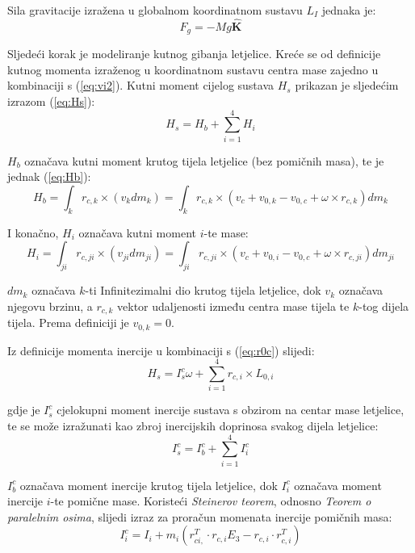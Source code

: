 \documentclass[11pt,a4paper]{article}
\begin{document}
Sila gravitacije izražena u globalnom koordinatnom sustavu $L_{I}$ jednaka je:
\begin{equation}
F_{g} = -Mg \bm{\hat{K}}
\label{eq:Fg}
\end{equation}


Sljedeći korak je modeliranje kutnog gibanja letjelice. Kreće se od definicije kutnog momenta izraženog u koordinatnom sustavu centra mase zajedno u kombinaciji s (\ref{eq:vi2}). Kutni moment cijelog sustava $H_{s}$ prikazan je sljedećim izrazom (\ref{eq:Hs}):
\begin{equation}
H_{s} = H_{b} + \sum_{i=1}^{4}H_{i}
\label{eq:Hs}
\end{equation}

$H_{b}$ označava kutni moment krutog tijela letjelice (bez pomičnih masa), te je jednak (\ref{eq:Hb}):
\begin{equation}
H_{b} = \int_{k} r_{c,k} \times (v_{k}dm_{k}) = \int_{k} r_{c,k} \times (v_{c} + v_{0,k} - v_{0,c} + \omega \times r_{c,k})dm_{k}
\label{eq:Hb}
\end{equation}

I konačno, $H_{i}$ označava kutni moment $i$-te mase:
\begin{equation}
H_{i} = \int_{ji} r_{c,ji} \times (v_{ji}dm_{ji}) = \int_{ji} r_{c,ji} \times (v_{c} + v_{0,i} - v_{0,c} + \omega \times r_{c,ji})dm_{ji}
\label{eq:Hi}
\end{equation}

$dm_{k}$ označava $k$-ti Infinitezimalni dio krutog tijela letjelice, dok $v_{k}$ označava njegovu brzinu, a $r_{c,k}$ vektor udaljenosti između centra mase tijela te $k$-tog dijela tijela. Prema definiciji je $v_{0,k} = 0$. 

Iz definicije momenta inercije u kombinaciji s (\ref{eq:r0c}) slijedi:
\begin{equation}
H_{s} = I_{s}^{c}\omega + \sum_{i=1}^{4}r_{c,i} \times L_{0,i}
\label{eq:Hs2}
\end{equation}

gdje je $I_{s}^{c}$ cjelokupni moment inercije sustava s obzirom na centar mase letjelice, te se može izražunati kao zbroj inercijskih doprinosa svakog dijela letjelice:
\begin{equation}
I_{s}^{c} = I_{b}^{c} + \sum_{i=1}^{4}I_{i}^{c}
\label{eq:Ics}
\end{equation}

$I_{b}^{c}$ označava moment inercije krutog tijela letjelice, dok $I_{i}^{c}$ označava moment inercije $i$-te pomične mase. Koristeći \textit{Steinerov teorem}, odnosno \textit{Teorem o paralelnim osima}, slijedi izraz za proračun momenata inercije pomičnih masa:
\begin{equation}
I_{i}^{c} = I_{i} + m_{i} \left(  r_{ci,}^{T} \cdot r_{c,i}E_{3} - r_{c,i}\cdot r_{c,i}^{T} \right)
\label{eq:Iic}
\end{equation}
\end{document}
